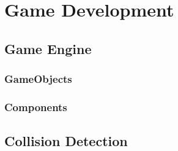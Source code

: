 \chapter{Game Development}
    \section{Game Engine}
        \subsection{GameObjects}
        \subsection{Components}
    \section{Collision Detection}